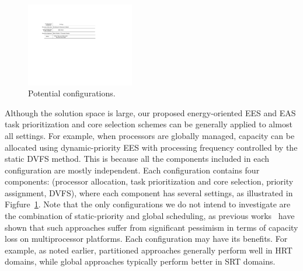 \begin{figure}
\vspace{-2mm}
\centerline{
\includegraphics[width=0.42\textwidth]{images/configurations.pdf}
} \caption{\small Potential configurations.}\normalsize
\label{fig:configurations}
\end{figure}
 Although the solution space is large, our proposed energy-oriented EES and EAS task prioritization and core selection schemes can be generally applied to almost all settings. For example, when processors are globally managed, capacity can be allocated using dynamic-priority EES with processing frequency controlled by the static DVFS method.  This is because all the components included in each configuration are mostly independent. Each configuration contains four components: (processor allocation, task prioritization and core selection, priority assignment, DVFS), where each component has several settings, as illustrated in Figfure~\ref{fig:configurations}. Note that the only configurations we do not intend to investigate are the combination of static-priority and global scheduling, as previous works~\cite{?} have shown that such approaches suffer from significant pessimism in terms of capacity loss on multiprocessor platforms.
  Each configuration may have its benefits. For example, as noted earlier, partitioned approaches generally perform well in HRT domains, while global approaches typically perform better in SRT domains. 
 
 

